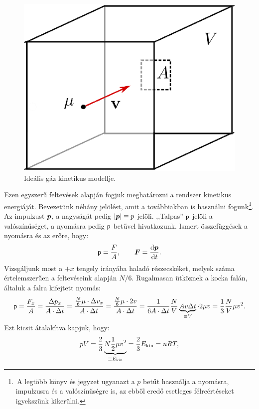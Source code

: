 \begin{figure}
    \centering
    \includegraphics{termo_3/termo_3_1.eps}
    \caption{Ideális gáz kinetikus modellje.}
    \label{fig:termo_3_1}
\end{figure}
Ezen egyszerű feltevések alapján fogjuk meghatározni a rendszer kinetikus energiáját. Bevezetünk néhány jelölést, amit a továbbiakban is használni fogunk\footnote{\,A legtöbb könyv és jegyzet ugyanazt a $p$ betűt használja a nyomásra, impulzusra és a valószínűségre is, az ebből eredő esetleges félreértéseket igyekszünk kikerülni.}. Az impulzust $\bm p$, a nagyságát pedig $|\bm p|\equiv p$ jelöli. ,,Talpas'' $\mathtt p$ jelöli a valószínűséget, a nyomásra pedig $\mathsf p$ betűvel hivatkozunk. Ismert összefüggések a nyomásra és az erőre, hogy:
\begin{align}
    \mathsf p = \frac FA,\qquad \bm F = \frac{\mathrm{d}{\bm p}}{\mathrm{d}{t}}.
\end{align}
Vizsgáljunk most a ${+}x$ tengely irányába haladó részecskéket, melyek száma értelemszerűen a feltevéseink alapján $N/6$. Rugalmasan ütköznek a kocka falán, általuk a falra kifejtett nyomás:
\begin{align}
    \mathsf p = \frac{F_x}{A} = \frac{\Delta p_x}{A\cdot \Delta t} = \frac{\frac N6 \mu \cdot \Delta v_x}{A\cdot \Delta t} = \frac{\frac N6 \mu\cdot 2v}{A\cdot \Delta t} = \frac{1}{6A\cdot\Delta t}\frac NV \underbrace{Av\Delta t}_{\equiv V}\cdot 2\mu v = \frac 13 \frac NV \mu v^2.
\end{align}
Ezt kicsit átalakítva kapjuk, hogy:
\begin{align}
    pV = \frac 23 \underbrace{N\frac 12\mu v^2}_{\equiv E_{\textnormal{kin}}} = \frac 23 E_{\textnormal{kin}} = nRT,
\end{align}
